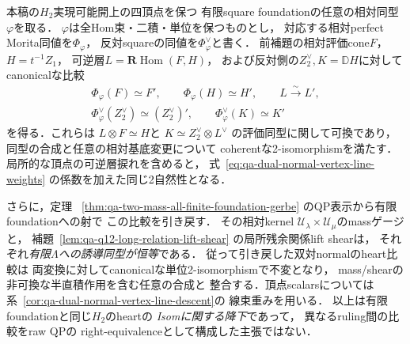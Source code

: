 \begin{proposition}
\label{prop:qa-dual-normal-all-square-isom-naturality}
本稿の$H_2$実現可能開上の四頂点を保つ
有限square foundationの任意の相対同型$\varphi$を取る．
$\varphi$は全Hom束・二積・単位を保つものとし，
対応する相対perfect Morita同値を$\Phi_\varphi$，
反対squareの同値を$\Phi_\varphi^\vee$と書く．
前補題の相対評価cone$F$，$H=t^{-1}Z_1$，
可逆層$L=\mathbf R\operatorname{Hom}(F,H)$，
および反対側の$Z_2^\vee,K=\mathbb D H$に対して
canonicalな比較
\[
 \begin{gathered}
 \Phi_\varphi(F)\simeq F',\qquad
 \Phi_\varphi(H)\simeq H',\qquad
 L\xrightarrow{\sim}L',\\
 \Phi_\varphi^\vee(Z_2^\vee)\simeq
 (Z_2^\vee)',\qquad
 \Phi_\varphi^\vee(K)\simeq K'
 \tag{NI}\label{eq:qa-dual-normal-full-isom-naturality}
 \end{gathered}
\]
を得る．これらは
$L\otimes F\simeq H$と
$K\simeq Z_2^\vee\otimes L^\vee$
の評価同型に関して可換であり，
同型の合成と任意の相対基底変更について
coherentな2-isomorphismを満たす．
局所的な頂点の可逆層捩れを含めると，
式~\eqref{eq:qa-dual-normal-vertex-line-weights}
の係数を加えた同じ2自然性となる．

さらに，定理~
\ref{thm:qa-two-mass-all-finite-foundation-gerbe}
のQP表示から有限foundationへの射で
この比較を引き戻す．
その相対kernel
$\mathcal U_\lambda\times\mathcal U_\mu$のmassゲージと，
補題~\ref{lem:qa-q12-long-relation-lift-shear}
の局所残余関係lift shearは，
それぞれ\emph{有限$\Lambda$への誘導同型が恒等}である．
従って引き戻した双対normalのheart比較は
両変換に対してcanonicalな単位2-isomorphismで不変となり，
mass/shearの非可換な半直積作用を含む任意の合成と
整合する．頂点scalarsについては
系~\ref{cor:qa-dual-normal-vertex-line-descent}の
線束重みを用いる．
以上は有限foundationと同じ$H_2$のheartの
\emph{Isomに関する降下}であって，
異なるruling間の比較をraw QPの
right-equivalenceとして構成した主張ではない．
\end{proposition}

